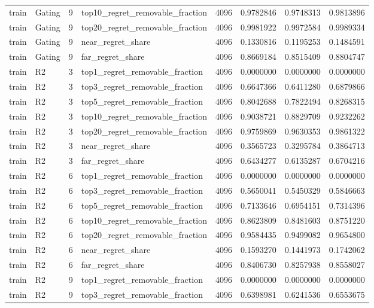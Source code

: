 \begin{tabular}{llrlrrrr}
train & Gating & 9 & top10_regret_removable_fraction & 4096 & 0.9782846 & 0.9748313 & 0.9813896 \\
train & Gating & 9 & top20_regret_removable_fraction & 4096 & 0.9981922 & 0.9972584 & 0.9989334 \\
train & Gating & 9 & near_regret_share & 4096 & 0.1330816 & 0.1195253 & 0.1484591 \\
train & Gating & 9 & far_regret_share & 4096 & 0.8669184 & 0.8515409 & 0.8804747 \\
train & R2 & 3 & top1_regret_removable_fraction & 4096 & 0.0000000 & 0.0000000 & 0.0000000 \\
train & R2 & 3 & top3_regret_removable_fraction & 4096 & 0.6647366 & 0.6411280 & 0.6879866 \\
train & R2 & 3 & top5_regret_removable_fraction & 4096 & 0.8042688 & 0.7822494 & 0.8268315 \\
train & R2 & 3 & top10_regret_removable_fraction & 4096 & 0.9038721 & 0.8829709 & 0.9232262 \\
train & R2 & 3 & top20_regret_removable_fraction & 4096 & 0.9759869 & 0.9630353 & 0.9861322 \\
train & R2 & 3 & near_regret_share & 4096 & 0.3565723 & 0.3295784 & 0.3864713 \\
train & R2 & 3 & far_regret_share & 4096 & 0.6434277 & 0.6135287 & 0.6704216 \\
train & R2 & 6 & top1_regret_removable_fraction & 4096 & 0.0000000 & 0.0000000 & 0.0000000 \\
train & R2 & 6 & top3_regret_removable_fraction & 4096 & 0.5650041 & 0.5450329 & 0.5846663 \\
train & R2 & 6 & top5_regret_removable_fraction & 4096 & 0.7133646 & 0.6954151 & 0.7314396 \\
train & R2 & 6 & top10_regret_removable_fraction & 4096 & 0.8623809 & 0.8481603 & 0.8751220 \\
train & R2 & 6 & top20_regret_removable_fraction & 4096 & 0.9584435 & 0.9499082 & 0.9654800 \\
train & R2 & 6 & near_regret_share & 4096 & 0.1593270 & 0.1441973 & 0.1742062 \\
train & R2 & 6 & far_regret_share & 4096 & 0.8406730 & 0.8257938 & 0.8558027 \\
train & R2 & 9 & top1_regret_removable_fraction & 4096 & 0.0000000 & 0.0000000 & 0.0000000 \\
train & R2 & 9 & top3_regret_removable_fraction & 4096 & 0.6398981 & 0.6241536 & 0.6553675 \\

\end{tabular}
